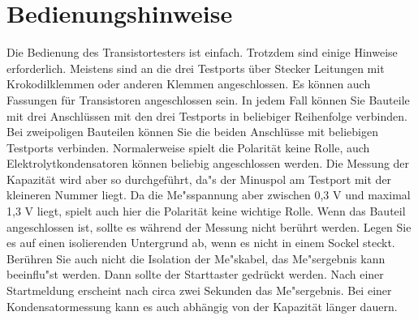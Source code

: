 \chapter{Bedienungshinweise}
\label{sec:manual}
Die Bedienung des Transistortesters ist einfach.
Trotzdem sind einige Hinweise erforderlich.
Meistens sind an die drei Testports \"uber Stecker Leitungen mit Krokodilklemmen oder anderen Klemmen angeschlossen.
Es k\"onnen auch Fassungen f\"ur Transistoren angeschlossen sein.
In jedem Fall k\"onnen Sie Bauteile mit drei Anschl\"ussen mit den drei Testports in beliebiger Reihenfolge verbinden.
Bei zweipoligen Bauteilen k\"onnen Sie die beiden Anschl\"usse mit beliebigen Testports verbinden.
Normalerweise spielt die Polarit\"at keine Rolle, auch Elektrolytkondensatoren k\"onnen beliebig angeschlossen werden.
Die Messung der Kapazit\"at wird aber so durchgef\"uhrt, da"s der Minuspol am Testport mit der kleineren Nummer liegt.
Da die Me"sspannung aber zwischen 0,3 V und maximal 1,3 V liegt, spielt auch hier die Polarit\"at keine wichtige Rolle.
Wenn das Bauteil angeschlossen ist, sollte es w\"ahrend der Messung nicht ber\"uhrt werden. Legen Sie es auf einen
isolierenden Untergrund ab, wenn es nicht in einem Sockel steckt. Ber\"uhren Sie auch nicht die Isolation der Me"skabel,
das Me"sergebnis kann beeinflu"st werden.
Dann sollte der Starttaster gedr\"uckt werden.
Nach einer Startmeldung erscheint nach circa zwei Sekunden das Me"sergebnis. Bei einer Kondensatormessung kann es
auch abh\"angig von der Kapazit\"at l\"anger dauern.

